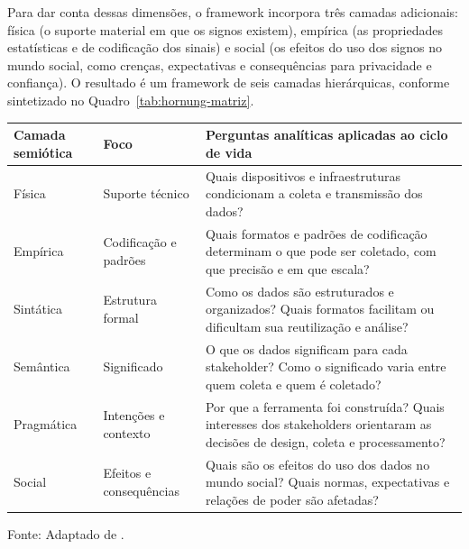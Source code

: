 \documentclass[
	12pt,				%
	oneside,			%
	a4paper,			%
	english,			%
	brazil				%
	]{abntex2ppgsi}
\begin{document}
    Para dar conta dessas dimensões, o framework incorpora três camadas adicionais: física (o suporte material em que os signos existem), empírica (as propriedades estatísticas e de codificação dos sinais) e social (os efeitos do uso dos signos no mundo social, como crenças, expectativas e consequências para privacidade e confiança). O resultado é um framework de seis camadas hierárquicas, conforme sintetizado no Quadro~\ref{tab:hornung-matriz}.

    
\begin{quadro}[h]
    \centering
    \caption{Matriz analítica: Ciclo de Vida dos Dados 
    $\times$ Semiótica Organizacional}
    \label{tab:hornung-matriz}
    \renewcommand{\arraystretch}{1.5}
    \small
    \begin{tabular}{p{2.5cm}p{2cm}p{7.5cm}}
        \hline
        \textbf{Camada semiótica} & 
        \textbf{Foco} & 
        \textbf{Perguntas analíticas aplicadas ao ciclo 
        de vida} \\
        \hline
        Física 
        & Suporte técnico 
        & Quais dispositivos e infraestruturas condicionam 
          a coleta e transmissão dos dados? \\
        Empírica 
        & Codificação e padrões 
        & Quais formatos e padrões de codificação 
          determinam o que pode ser coletado, com que 
          precisão e em que escala? \\
        Sintática 
        & Estrutura formal 
        & Como os dados são estruturados e organizados? 
          Quais formatos facilitam ou dificultam sua 
          reutilização e análise? \\
        Semântica 
        & Significado 
        & O que os dados significam para cada stakeholder? 
          Como o significado varia entre quem coleta e 
          quem é coletado? \\
        Pragmática 
        & Intenções e contexto 
        & Por que a ferramenta foi construída? Quais 
          interesses dos stakeholders orientaram as 
          decisões de design, coleta e processamento? \\
        Social 
        & Efeitos e consequências 
        & Quais são os efeitos do uso dos dados no mundo 
          social? Quais normas, expectativas e relações 
          de poder são afetadas? \\
        \hline
    \end{tabular}

    \vspace{0.2cm}
    {\small Fonte: Adaptado de .}
\end{quadro}
\end{document}
